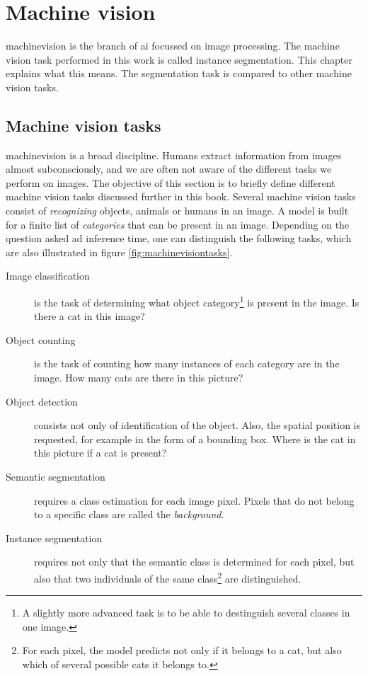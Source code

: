 \section{Machine vision}
\par{
    \Gls{machinevision} is the branch of \Gls{ai} focussed on image processing.
    The machine vision task performed in this work is called instance \Gls{segmentation}.
    This chapter explains what this means. 
    The segmentation task is compared to other machine vision tasks.
}

\subsection{Machine vision tasks \label{sec:machinevisiontasks}}
\par{
    \Gls{machinevision} is a broad discipline. 
    Humans extract information from images almost subconsciously, and we are often not aware of the different tasks we perform on images.
    The objective of this section is to briefly define different machine vision tasks discussed further in this book. 
    Several machine vision tasks consist of \textit{recognizing} objects, animals or humans in an image.
    A model is built for a finite list of \textit{categories} that can be present in an image.
    Depending on the question asked ad inference time, one can distinguish the following tasks, which are also illustrated in figure \ref{fig:machinevisiontasks}.
}
\begin{description}
    \item[Image classification] is the task of determining what object category\footnote{A slightly more advanced task is to be able to destinguish several classes in one image.} is present in the image. Is there a cat in this image?
    \item[Object counting] is the task of counting how many instances of each category are in the image. How many cats are there in this picture? 
    \item[Object detection] consists not only of identification of the object. Also, the spatial position is requested, for example in the form of a bounding box. Where is the cat in this picture if a cat is present?
    \item[Semantic segmentation] requires a class estimation for each image pixel. Pixels that do not belong to a specific class are called the \textit{background}.
    \item[Instance segmentation] requires not only that the semantic class is determined for each pixel, but also that two individuals of the same class\footnote{For each pixel, the model predicts not only if it belongs to a cat, but also which of several possible cats it belongs to.} are distinguished.   
\end{description}
